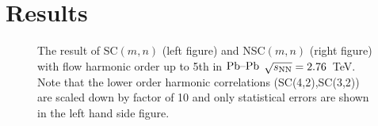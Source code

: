 \documentclass[ALICE,manyauthors]{cernphprep}
\begin{document}

% 

\section{Results}
\label{sec:results}

\begin{figure}[htbp]
            \begin{center}
        \caption{The result of SC$(m,n)$ (left figure) and NSC$(m,n)$ (right figure) with flow harmonic order up to 5th in $\textnormal{Pb--Pb}$ $\sqrt{s_{\textnormal{NN}}}=2.76$~TeV. Note that the lower order harmonic correlations (SC(4,2),SC(3,2)) are scaled down by factor of 10 and only statistical errors are shown in the left hand side figure.}
        \label{fig:Figure_1}
              \end{center}
\end{figure}
\end{document}
